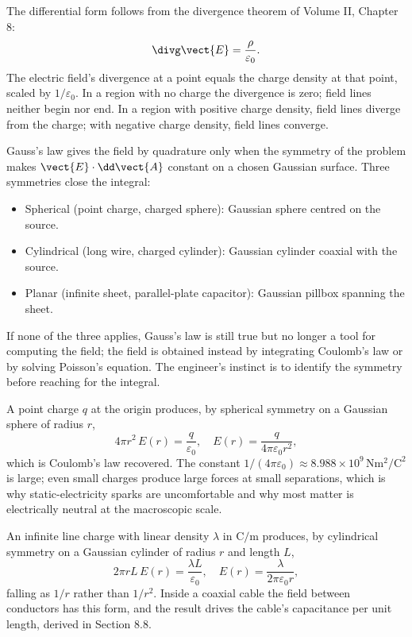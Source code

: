 The differential form follows from the divergence theorem of
Volume II, Chapter 8:
\[
\divg \vect{E} = \frac{\rho}{\varepsilon_{0}}.
\]
The electric field's divergence at a point equals the charge density at
that point, scaled by $1/\varepsilon_{0}$. In a region with no charge
the divergence is zero; field lines neither begin nor end. In a region
with positive charge density, field lines diverge from the charge; with
negative charge density, field lines converge.

\begin{principle}
Gauss's law gives the field by quadrature only when the symmetry of the
problem makes $\vect{E}\cdot\dd\vect{A}$ constant on a chosen Gaussian
surface. Three symmetries close the integral:
\begin{itemize}[leftmargin=*]
  \item Spherical (point charge, charged sphere): Gaussian sphere
    centred on the source.
  \item Cylindrical (long wire, charged cylinder): Gaussian cylinder
    coaxial with the source.
  \item Planar (infinite sheet, parallel-plate capacitor):
    Gaussian pillbox spanning the sheet.
\end{itemize}
If none of the three applies, Gauss's law is still true but no longer
a tool for computing the field; the field is obtained instead by
integrating Coulomb's law or by solving Poisson's equation. The
engineer's instinct is to identify the symmetry before reaching for
the integral.
\end{principle}



A point charge $q$ at the origin produces, by spherical symmetry on
a Gaussian sphere of radius $r$,
\[
4\pi r^{2}\, E(r) = \frac{q}{\varepsilon_{0}}, \quad E(r) =
\frac{q}{4\pi \varepsilon_{0} r^{2}},
\]
which is Coulomb's law recovered. The constant $1/(4\pi\varepsilon_{0})
\approx 8.988\times 10^{9}\,\si{\newton\meter\squared\per\coulomb
\squared}$ is large; even small charges produce large forces at small
separations, which is why static-electricity sparks are uncomfortable
and why most matter is electrically neutral at the macroscopic scale.

An infinite line charge with linear density $\lambda$ in $\si{\coulomb
\per\meter}$ produces, by cylindrical symmetry on a Gaussian cylinder
of radius $r$ and length $L$,
\[
2\pi r L\, E(r) = \frac{\lambda L}{\varepsilon_{0}}, \quad E(r) =
\frac{\lambda}{2\pi \varepsilon_{0} r},
\]
falling as $1/r$ rather than $1/r^{2}$. Inside a coaxial cable the
field between conductors has this form, and the result drives the
cable's capacitance per unit length, derived in Section 8.8.

